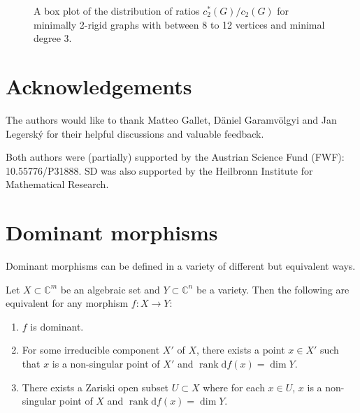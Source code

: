 \documentclass[ALCO]{cedram}
\DeclareMathOperator{\rank}{rank}
\newcommand{\diff}{\mathrm{d}}
\begin{document}
\begin{figure}[ht]
 \centering
 \caption{A box plot of the distribution of ratios $c^*_2(G)/c_2(G)$ for minimally 2-rigid graphs with between 8 to 12 vertices and minimal degree 3.}
 \label{fig:ratios}
\end{figure}

\section*{Acknowledgements}

The authors would like to thank Matteo Gallet, D\"{a}niel Garamv\"{o}lgyi and Jan Legersk\'{y} for their helpful discussions and valuable feedback.

Both authors were (partially) supported by the Austrian Science Fund (FWF): 10.55776/P31888.
SD was also supported by the Heilbronn Institute for Mathematical Research.

\appendix

\section{Dominant morphisms}
\label{sec:dom}

Dominant morphisms can be defined in a variety of different but equivalent ways.

\begin{theorem}\label{borel91}
	Let $X \subset \mathbb{C}^m$ be an algebraic set and $Y \subset \mathbb{C}^n$ be a variety.
	Then the following are equivalent for any morphism $f :X \rightarrow Y$:
	\begin{enumerate}
		\item $f$ is dominant.
		\item For some irreducible component $X'$ of $X$, there exists a point $x \in X'$ such that $x$ is a non-singular point of $X'$ and $\rank \diff f(x) = \dim Y$.
		\item There exists a Zariski open subset $U \subset X$ where for each $x \in U$, $x$ is a non-singular point of $X$ and $\rank \diff f(x) = \dim Y$.
	\end{enumerate}
\end{theorem}
\end{document}
